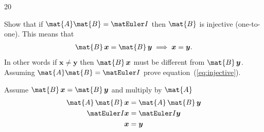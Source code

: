 \documentclass{sotonExamBoxes}    %
\begin{document}
\begin{question}{20}
\begin{qparts}
{        Show that if $\mat{A}\mat{B}= \Id$ then $\mat{B}$ is
        injective (one-to-one).  This means that
        \begin{align}
          \mat{B}\, \bm{x} = \mat{B}\, \bm{y} \implies \bm{x} =
          \bm{y}.
          \label{eq:injective}
        \end{align}
        In other words if $\bm{x}\neq\bm{y}$ then $\mat{B}\, \bm{x}$
        must be different from $\mat{B}\, \bm{y}$.  Assuming
        $\mat{A}\mat{B}= \Id$ prove equation~(\ref{eq:injective}).
      \begin{answer}
        Assume $\mat{B}\, \bm{x} = \mat{B}\, \bm{y}$ and multiply by $\mat{A}$
        \begin{align*}
          \mat{A}\,\mat{B}\, \bm{x} &= \mat{A}\,\mat{B}\, \bm{y} \\
          \Id \bm{x} &= \Id \bm{y} \\
          \bm{x} &= \bm{y}
        \end{align*}
      \end{answer}}{}
    


\end{qparts}
\end{question}
\end{document}
